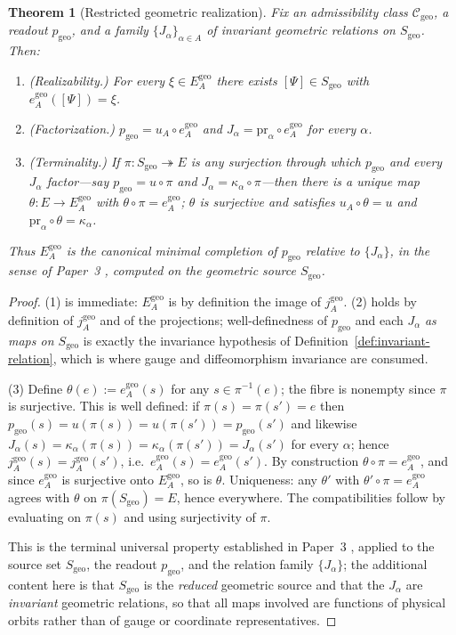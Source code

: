 \documentclass[11pt,a4paper]{article}
\theoremstyle{plain}
\newtheorem{theorem}{Theorem}[section]
\theoremstyle{definition}
\theoremstyle{remark}
\newcommand{\Cgeo}{\mathcal{C}_{\mathrm{geo}}}
\newcommand{\Sgeo}{S_{\mathrm{geo}}}
\newcommand{\Egeo}{E_A^{\mathrm{geo}}}
\newcommand{\pgeo}{p_{\mathrm{geo}}}
\newcommand{\jgeo}{j_A^{\mathrm{geo}}}
\newcommand{\egeo}{e_A^{\mathrm{geo}}}
\begin{document}
\begin{theorem}[Restricted geometric realization]
\label{thm:restricted-realization}
Fix an admissibility class $\Cgeo$, a readout $\pgeo$, and a family $\{J_\alpha\}_{\alpha\in A}$ of
invariant geometric relations on $\Sgeo$. Then:
\begin{enumerate}[label=(\arabic*),leftmargin=2.2em]
\item \emph{(Realizability.)} For every $\xi\in\Egeo$ there exists $[\Psi]\in\Sgeo$ with
      $\egeo([\Psi])=\xi$.
\item \emph{(Factorization.)} $\pgeo=u_A\circ\egeo$ and
      $J_\alpha=\mathrm{pr}_\alpha\circ\egeo$ for every $\alpha$.
\item \emph{(Terminality.)} If $\pi\colon\Sgeo\twoheadrightarrow E$ is any surjection through which
      $\pgeo$ and every $J_\alpha$ factor---say $\pgeo=u\circ\pi$ and
      $J_\alpha=\kappa_\alpha\circ\pi$---then there is a \emph{unique} map
      $\theta\colon E\to\Egeo$ with $\theta\circ\pi=\egeo$; $\theta$ is surjective and satisfies
      $u_A\circ\theta=u$ and $\mathrm{pr}_\alpha\circ\theta=\kappa_\alpha$.
\end{enumerate}
Thus $\Egeo$ is the canonical minimal completion of $\pgeo$ relative to $\{J_\alpha\}$, in the
sense of Paper~3 \cite{ST3}, computed on the geometric source $\Sgeo$.
\end{theorem}

\begin{proof}
(1) is immediate: $\Egeo$ is by definition the image of $\jgeo$. (2) holds by definition of $\jgeo$
and of the projections; well-definedness of $\pgeo$ and each $J_\alpha$ \emph{as maps on $\Sgeo$}
is exactly the invariance hypothesis of Definition~\ref{def:invariant-relation}, which is where
gauge and diffeomorphism invariance are consumed.

(3) Define $\theta(e):=\egeo(s)$ for any $s\in\pi^{-1}(e)$; the fibre is nonempty since $\pi$ is
surjective. This is well defined: if $\pi(s)=\pi(s')=e$ then
$\pgeo(s)=u(\pi(s))=u(\pi(s'))=\pgeo(s')$ and likewise
$J_\alpha(s)=\kappa_\alpha(\pi(s))=\kappa_\alpha(\pi(s'))=J_\alpha(s')$ for every $\alpha$; hence
$\jgeo(s)=\jgeo(s')$, i.e.\ $\egeo(s)=\egeo(s')$. By construction $\theta\circ\pi=\egeo$, and since
$\egeo$ is surjective onto $\Egeo$, so is $\theta$. Uniqueness: any $\theta'$ with
$\theta'\circ\pi=\egeo$ agrees with $\theta$ on $\pi(\Sgeo)=E$, hence everywhere. The
compatibilities follow by evaluating on $\pi(s)$ and using surjectivity of $\pi$.

This is the terminal universal property established in Paper~3 \cite{ST3}, applied to the source set
$\Sgeo$, the readout $\pgeo$, and the relation family $\{J_\alpha\}$; the additional content here is
that $\Sgeo$ is the \emph{reduced} geometric source and that the $J_\alpha$ are \emph{invariant}
geometric relations, so that all maps involved are functions of physical orbits rather than of gauge
or coordinate representatives.
\end{proof}
\end{document}
